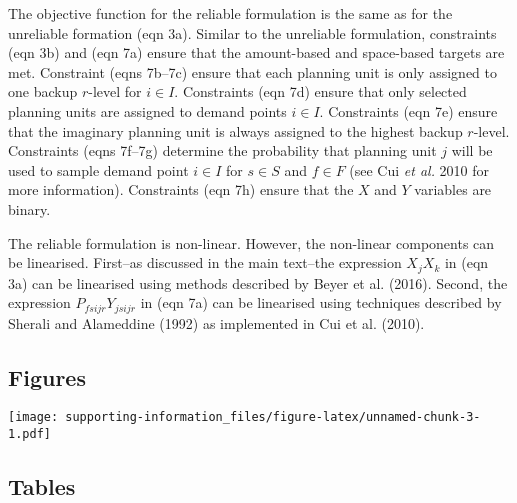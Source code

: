 \documentclass[11pt,]{article}
\let\origfigure\figure
\let\endorigfigure\endfigure
\renewenvironment{figure}[1][2] {
	\expandafter\origfigure\expandafter[H]
} {
	\endorigfigure
}
\begin{document}
The objective function for the reliable formulation is the same as for
the unreliable formation (eqn 3a). Similar to the unreliable
formulation, constraints (eqn 3b) and (eqn 7a) ensure that the
amount-based and space-based targets are met. Constraint (eqns 7b--7c)
ensure that each planning unit is only assigned to one backup $r$-level
for $i \in I$. Constraints (eqn 7d) ensure that only selected planning
units are assigned to demand points $i \in I$. Constraints (eqn 7e)
ensure that the imaginary planning unit is always assigned to the
highest backup $r$-level. Constraints (eqns 7f--7g) determine the
probability that planning unit $j$ will be used to sample demand point
$i \in I$ for $s \in S$ and $f \in F$ (see Cui \emph{et al.} 2010 for
more information). Constraints (eqn 7h) ensure that the $X$ and $Y$
variables are binary.

The reliable formulation is non-linear. However, the non-linear
components can be linearised. First--as discussed in the main text--the
expression $X_j X_k$ in (eqn 3a) can be linearised using methods
described by Beyer et al. (2016). Second, the expression
$P_{fsijr} Y_{jsijr}$ in (eqn 7a) can be linearised using techniques
described by Sherali and Alameddine (1992) as implemented in Cui et al.
(2010).

\subsection{Figures}\label{figures}

\begin{figure}[htbp]
\centering
\texttt{[image: supporting-information\_files/figure-latex/unnamed-chunk-3-1.pdf]}
\caption{Attribute spaces used in the first case-study. Each panel shows
a the distribution of a solution in environmental space and how it
samples the realised niche for a different species. The left column of
panels shows the solution generated using amount targets. The right
column of panels shows the solution generated using amount and niche
targets. Each column of panels corresponds to a different species.
Hexagons show the distribution of demand points. The color of each
heaxgon denotes the weighted frequency of demand points inside it.
Points represent the environmental conditions associated with planning
units inside the species geographic range that were selected for
preservation in a given solution.}
\end{figure}

\subsection{Tables}\label{tables}
\end{document}
